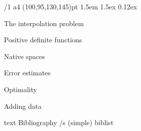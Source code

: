\useOpTeX  %


\hyperlinks \Black \Black
{}

\enlang
\fontfam[EBGaramond]

\def\QED{\Umathchar"0"01"00203B}

\margins/1 a4 (100,95,130,145)pt
\typosize[12.21/14.5]
\parindent 1.5em
\parskip 1.5ex
 0.12ex




\sec The interpolation problem


\sec Positive definite functions


\sec Native spaces


\sec Error estimates


\sec Optimality


\sec Adding data









\let\_mtext\ignoreit
\nonum\chap Bibliography
\def\_opwarning#1{}
\usebib/s (simple) biblist


\bye
